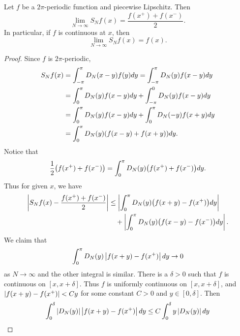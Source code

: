 \begin{theorem}
    Let $f$ be a $2\pi$-periodic function and piecewise Lipschitz. Then 
    \begin{equation*}
        \lim_{N\to\infty} S_Nf(x) = \frac{f(x^+)+f(x^-)}{2}.
    \end{equation*}
    In particular, if $f$ is continuous at $x$, then 
    \begin{equation*}
        \lim_{N\to\infty} S_Nf(x) = f(x).
    \end{equation*}
\end{theorem}
\begin{proof}
    Since $f$ is $2\pi$-periodic,
    \begin{equation*}
        \begin{split}
            S_Nf(x) &= \int_{-\pi}^\pi D_N(x-y)f(y)dy = \int_{-\pi}^\pi D_N(y)f(x-y)dy \\
            &= \int_0^\pi D_N(y)f(x-y)dy + \int_{-\pi}^0 D_N(y)f(x-y)dy \\
            &= \int_0^\pi D_N(y)f(x-y)dy + \int_0^\pi D_N(-y)f(x+y)dy \\
            &= \int_0^\pi D_N(y)\pth{f(x-y)+f(x+y)}dy.
        \end{split}
    \end{equation*}
    Notice that 
    \begin{equation*}
        \frac{1}{2}\pth{f(x^+)+f(x^-)} = \int_0^\pi D_N(y)\pth{f(x^+)+f(x^-)}dy.
    \end{equation*}
    Thus for given $x$, we have 
    \begin{equation*}
        \begin{split}
            \abs{S_Nf(x) - \frac{f(x^+)+f(x^-)}{2}} &\leq \abs{\int_0^\pi D_N(y)\pth{f(x+y)-f(x^+)}dy} \\
            &\quad + \abs{\int_0^\pi D_N(y)\pth{f(x-y)-f(x^-)}dy}.
        \end{split}
    \end{equation*}
    We claim that 
    \begin{equation*}
        \int_0^\pi D_N(y)\left\lvert {f(x+y)-f(x^+)} \right\rvert dy \to 0
    \end{equation*}
    as $N\to\infty$ and the other integral is similar. There is a $\delta>0$ such that 
    $f$ is continuous on $[x,x+\delta]$. Thus $f$ is uniformly continuous on 
    $[x,x+\delta]$, and $\left\lvert {f(x+y)-f(x^+)} \right\rvert < Cy$ for some constant $C>0$ and 
    $y\in[0,\delta]$. Then 
    \begin{equation*}
        \int_0^\delta \abs{D_N(y)}\abs{f(x+y)-f(x^+)}dy \leq C\int_0^\delta y\abs{D_N(y)}dy

\end{equation*}
\end{proof}
